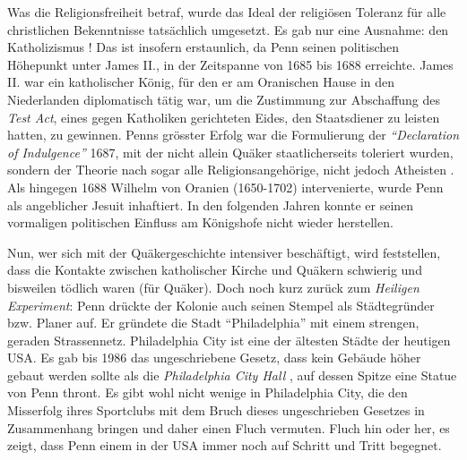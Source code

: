 \medskip

Was die Religionsfreiheit betraf, wurde das Ideal der religiösen Toleranz für
alle
christlichen Bekenntnisse tatsächlich umgesetzt. Es gab nur eine Ausnahme: den
Katholizismus ! Das ist insofern erstaunlich, da Penn
seinen politischen Höhepunkt unter James II.,
 in der Zeitspanne von 1685 bis 1688 erreichte. James II. war ein
katholischer König, für den er am Oranischen Hause in
den Niederlanden
 diplomatisch tätig war, um die Zustimmung zur
Abschaffung des \textit{Test Act}, eines gegen Katholiken gerichteten Eides,
den Staatsdiener zu leisten hatten, zu gewinnen. Penns grösster
Erfolg war die Formulierung
der \textit{"`Declaration of Indulgence"'} 1687, mit der nicht allein Quäker
staatlicherseits toleriert wurden, sondern der Theorie nach sogar alle
Religionsangehörige, nicht jedoch Atheisten . Als
hingegen 1688 Wilhelm von Oranien (1650-1702)  intervenierte, wurde Penn als angeblicher
Jesuit inhaftiert. In den folgenden Jahren konnte er
seinen vormaligen politischen Einfluss am Königshofe  nicht
wieder herstellen.



\medskip

Nun, wer sich mit der Quäkergeschichte intensiver beschäftigt, wird feststellen,
dass die Kontakte zwischen katholischer Kirche und Quäkern schwierig und
bisweilen tödlich waren (für Quäker). Doch noch kurz zurück zum \textit{Heiligen
Experiment}: Penn drückte der Kolonie auch seinen Stempel als Städtegründer
bzw. Planer auf. Er gründete die Stadt "`Philadelphia"' mit einem strengen, geraden
Strassennetz. Philadelphia City ist eine der ältesten Städte der heutigen USA. Es gab
bis 1986 das ungeschriebene Gesetz, dass kein Gebäude höher gebaut werden sollte
als die \textit{Philadelphia City Hall} ,
auf dessen Spitze eine Statue von Penn thront. Es gibt wohl nicht wenige in
Philadelphia City, die den Misserfolg ihres Sportclubs
mit dem Bruch dieses ungeschrieben Gesetzes in Zusammenhang bringen und daher einen Fluch vermuten.
Fluch hin oder her, es zeigt, dass Penn einem in der USA immer noch auf
Schritt und Tritt
begegnet.

